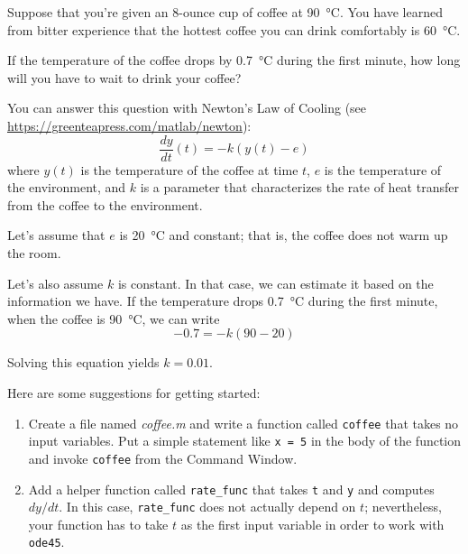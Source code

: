 \begin{ex}


Suppose that you're given an 8-ounce cup of coffee at \SI{90}{\celsius}.
You have learned from bitter experience that the hottest coffee you
can drink comfortably is \SI{60}{\celsius}.

If the temperature of the coffee drops by \SI{0.7}{\celsius} during the first minute, how long will you have to wait to drink your coffee?

You can answer this question with Newton's Law of Cooling (see  \url{https://greenteapress.com/matlab/newton}):
%
\begin{equation*}
\frac{dy}{dt}(t) = -k (y(t) - e)
\end{equation*}
%
where $y(t)$ is the temperature of the coffee at time $t$,
$e$ is the temperature of the environment, and $k$ is a parameter
that characterizes the rate of heat transfer from the coffee to the environment.

Let's assume that $e$ is \SI{20}{\celsius} and constant; that is, the coffee does not warm up the room.

Let's also assume $k$ is constant.  In that case, we can estimate it based on the information we have.  If the temperature drops \SI{0.7}{\celsius} during the first minute, when the coffee is \SI{90}{\celsius}, we can write
%
\begin{equation*}
-0.7 = -k (90 - 20)
\end{equation*}
%

Solving this equation yields $k = 0.01$.

Here are some suggestions for getting started:

\begin{enumerate}

\item Create a file named \emph{coffee.m} and write a function
called \lstinline{coffee} that takes no input variables.  Put a simple statement like \lstinline{x = 5} in the body of the function and invoke \lstinline{coffee} from the Command  Window.

\item Add a helper function called \lstinline{rate_func} that takes \lstinline{t} and \lstinline{y} and computes $dy/dt$.  In this case, \lstinline{rate_func} does not actually depend on $t$; nevertheless, your function has to take $t$ as the first input variable in order to work with \lstinline{ode45}.


\end{enumerate}
\end{ex}
